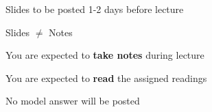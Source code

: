 \begin{frame}
\begin{center}
\large
Slides to be posted 1-2 days before lecture
\end{center}
\end{frame}

\begin{frame}
\begin{center}
\large
Slides $\not=$ Notes
\end{center}
\end{frame}

\begin{frame}
\begin{center}
\large
You are expected to \textbf{take notes} during lecture
\end{center}
\end{frame}

\begin{frame}
\begin{center}
\large
You are expected to \textbf{read} the assigned readings
\end{center}
\end{frame}

\begin{frame}
\begin{center}
\large
No model answer will be posted
\end{center}
\end{frame}

